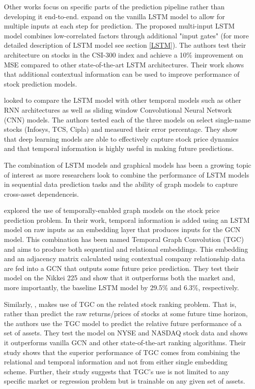 Other works focus on specific parts of the prediction pipeline rather than developing it end-to-end. \cite{Li2018} expand on the vanilla LSTM model to allow for multiple inputs at each step for prediction. The proposed multi-input LSTM model combines low-correlated factors through additional "input gates" (for more detailed description of LSTM model see section \ref{LSTM}). The authors test their architecture on stocks in the CSI-300 index and achieve a 10\% improvement on MSE compared to other state-of-the-art LSTM architectures. Their work shows that additional contextual information can be used to improve performance of stock prediction models.

\cite{Selvin2017} looked to compare the LSTM model with other temporal models such as other RNN architectures as well as sliding window Convolutional Neural Network (CNN) models. The authors tested each of the three models on select single-name stocks (Infosys, TCS, Cipla) and measured their error percentage. They show that deep learning models are able to effectively capture stock price dynamics and that temporal information is highly useful in making future predictions.

The combination of LSTM models and graphical models has been a growing topic of interest as more researchers look to combine the performance of LSTM models in sequential data prediction tasks and the ability of graph models to capture cross-asset dependenceis.


\cite{Matsunaga2019} explored the use of temporally-enabled graph models on the stock price prediction problem. In their work, temporal information is added using an LSTM model on raw inputs as an embedding layer that produces inputs for the GCN model. This combination has been named Temporal Graph Convolution (TGC) and aims to produce both sequential and relational embeddings. This embedding and an adjacency matrix calculated using contextual company relationship data are fed into a GCN that outputs some future price prediction. They test their model on the Nikkei 225 and show that it outperforms both the market and, more importantly, the baseline LSTM model by 29.5\% and 6.3\%, respectively.

Similarly, \cite{Feng2019}, makes use of TGC on the related stock ranking problem. That is, rather than predict the raw returns/prices of stocks at some future time horizon, the authors use the TGC model to predict the relative future performance of a set of assets. They test the model on NYSE and NASDAQ stock data and shows it outperforms vanilla GCN and other state-of-the-art ranking algorithms. Their study shows that the superior performance of TGC comes from combining the relational and temporal information and not from either single embedding scheme. Further, their study suggests that TGC's use is not limited to any specific market or regression problem but is trainable on any given set of assets.

